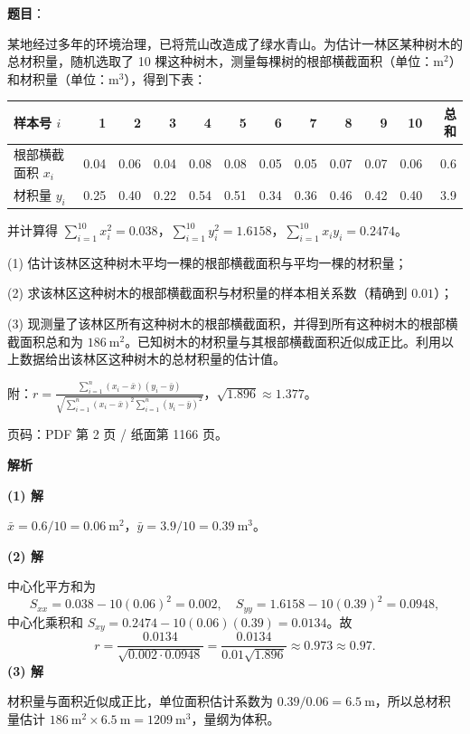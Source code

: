 \begin{answer}

\textbf{题目}：

某地经过多年的环境治理，已将荒山改造成了绿水青山。为估计一林区某种树木的总材积量，随机选取了 10 棵这种树木，测量每棵树的根部横截面积（单位：$\mathrm m^2$）和材积量（单位：$\mathrm m^3$），得到下表：

\begin{center}
\begingroup\setlength{\tabcolsep}{4pt}
\begin{tabular}{lrrrrrrrrrrr}
\toprule
样本号 $i$ & 1 & 2 & 3 & 4 & 5 & 6 & 7 & 8 & 9 & 10 & 总和 \\
\midrule
根部横截面积 $x_i$ & 0.04 & 0.06 & 0.04 & 0.08 & 0.08 & 0.05 & 0.05 & 0.07 & 0.07 & 0.06 & 0.6 \\
材积量 $y_i$ & 0.25 & 0.40 & 0.22 & 0.54 & 0.51 & 0.34 & 0.36 & 0.46 & 0.42 & 0.40 & 3.9 \\
\bottomrule
\end{tabular}
\endgroup
\end{center}

并计算得 $\displaystyle\sum_{i=1}^{10}x_i^2=0.038$，$\displaystyle\sum_{i=1}^{10}y_i^2=1.6158$，$\displaystyle\sum_{i=1}^{10}x_iy_i=0.2474$。

  (1) 估计该林区这种树木平均一棵的根部横截面积与平均一棵的材积量；

  (2) 求该林区这种树木的根部横截面积与材积量的样本相关系数（精确到 $0.01$）；

  (3) 现测量了该林区所有这种树木的根部横截面积，并得到所有这种树木的根部横截面积总和为 $186\ \mathrm m^2$。已知树木的材积量与其根部横截面积近似成正比。利用以上数据给出该林区这种树木的总材积量的估计值。

附：$\displaystyle r=\frac{\sum_{i=1}^n(x_i-\bar x)(y_i-\bar y)}{\sqrt{\sum_{i=1}^n(x_i-\bar x)^2\sum_{i=1}^n(y_i-\bar y)^2}}$，$\sqrt{1.896}\approx1.377$。

\begin{gktip}
页码：PDF 第 2 页 / 纸面第 1166 页。
\end{gktip}

\textbf{解析}

\textbf{(1) 解}

$\bar x=0.6/10=0.06\ \mathrm m^2$，$\bar y=3.9/10=0.39\ \mathrm m^3$。

\textbf{(2) 解}

中心化平方和为
\nopagebreak[4]
\[
S_{xx}=0.038-10(0.06)^2=0.002,\quad
S_{yy}=1.6158-10(0.39)^2=0.0948,
\]
中心化乘积和 $S_{xy}=0.2474-10(0.06)(0.39)=0.0134$。故
\nopagebreak[4]
\[
r=\frac{0.0134}{\sqrt{0.002\cdot0.0948}}
=\frac{0.0134}{0.01\sqrt{1.896}}\approx0.973\approx0.97.
\]
\textbf{(3) 解}

材积量与面积近似成正比，单位面积估计系数为 $0.39/0.06=6.5\ \mathrm m$，所以总材积量估计 $186\ \mathrm m^2\times6.5\ \mathrm m=1209\ \mathrm m^3$，量纲为体积。




\end{answer}
